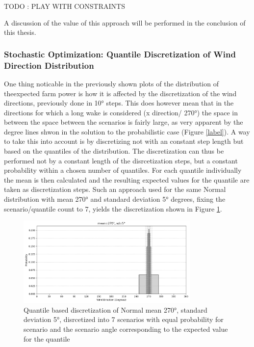 TODO : PLAY WITH CONSTRAINTS

A discussion of the value of this approach will be performed in the conclusion of this thesis. 
	
\subsubsection{Stochastic Optimization: Quantile Discretization of Wind Direction Distribution }

One thing noticable in the previously shown plots of the distribution of theexpected farm power is how it is affected by the discretization of the wind directions, previously done in 10° steps. This does however mean that in the directions for which a long wake is considered (x direction/ 270°) the space in between the space between the scenarios  is fairly large, as very apparent  by the degree lines shwon in the solution to the probabilistic case (Figure \ref{label}). A way to take this into account is by discretizing not with an constant step length but based on the quantiles of the distribution. The discretization can thus be performed not by a constant length of the disrcetization steps, but a constant probability within a chosen number of quantiles. For each quantile individually the mean is then calculated and the resulting expected values for the quantile are taken as discretization steps. Such an approach used for the same Normal distribution with mean 270° and standard deviation 5° degrees, fixing the scenario/quantile count to 7, yields the discretization shown in Figure \ref{fig:wind_dist_opti_quantiles}. 

\begin{figure}[h] 
	\centering
	\includegraphics[width=0.8\textwidth]{figures/optimization/wind_dist_opti_quantiles.png} 
	\caption{Quantile based discretization of Normal mean 270°,  standard deviation 5°, disrcetized into 7 scenarios with equal probability for scenario and the scenario angle corresponding to the expected value for the quantile }
	\label{fig:wind_dist_opti_quantiles}
\end{figure} 

